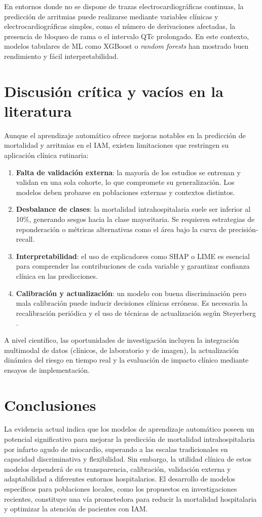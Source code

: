 \documentclass[12pt,a4paper]{article}
\begin{document}
En entornos donde no se dispone de trazas electrocardiográficas continuas, la predicción de arritmias puede realizarse mediante variables clínicas y electrocardiográficas simples, como el número de derivaciones afectadas, la presencia de bloqueo de rama o el intervalo QTc prolongado. En este contexto, modelos tabulares de ML como XGBoost o \textit{random forests} han mostrado buen rendimiento y fácil interpretabilidad.

\section{Discusión crítica y vacíos en la literatura}
Aunque el aprendizaje automático ofrece mejoras notables en la predicción de mortalidad y arritmias en el IAM, existen limitaciones que restringen su aplicación clínica rutinaria:

\begin{enumerate}
  \item \textbf{Falta de validación externa}: la mayoría de los estudios se entrenan y validan en una sola cohorte, lo que compromete su generalización. Los modelos deben probarse en poblaciones externas y contextos distintos.
  \item \textbf{Desbalance de clases}: la mortalidad intrahospitalaria suele ser inferior al 10\%, generando sesgos hacia la clase mayoritaria. Se requieren estrategias de reponderación o métricas alternativas como el área bajo la curva de precisión-recall.
  \item \textbf{Interpretabilidad}: el uso de explicadores como SHAP o LIME es esencial para comprender las contribuciones de cada variable y garantizar confianza clínica en las predicciones.
  \item \textbf{Calibración y actualización}: un modelo con buena discriminación pero mala calibración puede inducir decisiones clínicas erróneas. Es necesaria la recalibración periódica y el uso de técnicas de actualización según Steyerberg \citep{steyerberg2019clinical}.
\end{enumerate}

A nivel científico, las oportunidades de investigación incluyen la integración multimodal de datos (clínicos, de laboratorio y de imagen), la actualización dinámica del riesgo en tiempo real y la evaluación de impacto clínico mediante ensayos de implementación.

\section{Conclusiones}
La evidencia actual indica que los modelos de aprendizaje automático poseen un potencial significativo para mejorar la predicción de mortalidad intrahospitalaria por infarto agudo de miocardio, superando a las escalas tradicionales en capacidad discriminativa y flexibilidad. Sin embargo, la utilidad clínica de estos modelos dependerá de su transparencia, calibración, validación externa y adaptabilidad a diferentes entornos hospitalarios. El desarrollo de modelos específicos para poblaciones locales, como los propuestos en investigaciones recientes, constituye una vía prometedora para reducir la mortalidad hospitalaria y optimizar la atención de pacientes con IAM.



\end{document}
